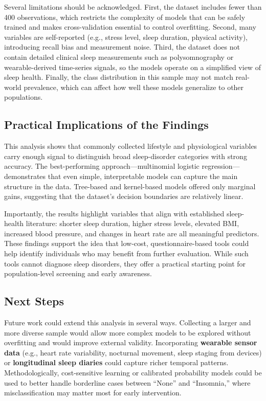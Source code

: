 \documentclass[
]{article}
\begin{document}
Several limitations should be acknowledged. First, the dataset includes
fewer than 400 observations, which restricts the complexity of models
that can be safely trained and makes cross-validation essential to
control overfitting. Second, many variables are self-reported (e.g.,
stress level, sleep duration, physical activity), introducing recall
bias and measurement noise. Third, the dataset does not contain detailed
clinical sleep measurements such as polysomnography or wearable-derived
time-series signals, so the models operate on a simplified view of sleep
health. Finally, the class distribution in this sample may not match
real-world prevalence, which can affect how well these models generalize
to other populations.

\subsection{Practical Implications of the
Findings}\label{practical-implications-of-the-findings}

This analysis shows that commonly collected lifestyle and physiological
variables carry enough signal to distinguish broad sleep-disorder
categories with strong accuracy. The best-performing
approach---multinomial logistic regression---demonstrates that even
simple, interpretable models can capture the main structure in the data.
Tree-based and kernel-based models offered only marginal gains,
suggesting that the dataset's decision boundaries are relatively linear.

Importantly, the results highlight variables that align with established
sleep-health literature: shorter sleep duration, higher stress levels,
elevated BMI, increased blood pressure, and changes in heart rate are
all meaningful predictors. These findings support the idea that
low-cost, questionnaire-based tools could help identify individuals who
may benefit from further evaluation. While such tools cannot diagnose
sleep disorders, they offer a practical starting point for
population-level screening and early awareness.

\subsection{Next Steps}\label{next-steps}

Future work could extend this analysis in several ways. Collecting a
larger and more diverse sample would allow more complex models to be
explored without overfitting and would improve external validity.
Incorporating \textbf{wearable sensor data} (e.g., heart rate
variability, nocturnal movement, sleep staging from devices) or
\textbf{longitudinal sleep diaries} could capture richer temporal
patterns. Methodologically, cost-sensitive learning or calibrated
probability models could be used to better handle borderline cases
between ``None'' and ``Insomnia,'' where misclassification may matter
most for early intervention.
\end{document}
